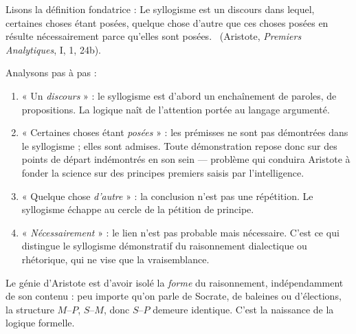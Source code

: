 \documentclass[11pt]{article}
\begin{document}
\begin{experience}
Lisons la définition fondatrice : \guillemotleft Le syllogisme est un discours dans lequel, certaines choses étant posées, quelque chose d'autre que ces choses posées en résulte nécessairement parce qu'elles sont posées. \guillemotright\ (Aristote, \emph{Premiers Analytiques}, I, 1, 24b).

Analysons pas à pas :
\begin{enumerate}
\item « Un \emph{discours} » : le syllogisme est d'abord un enchaînement de paroles, de propositions. La logique naît de l'attention portée au langage argumenté.
\item « Certaines choses étant \emph{posées} » : les prémisses ne sont pas démontrées dans le syllogisme ; elles sont admises. Toute démonstration repose donc sur des points de départ indémontrés en son sein — problème qui conduira Aristote à fonder la science sur des principes premiers saisis par l'intelligence.
\item « Quelque chose \emph{d'autre} » : la conclusion n'est pas une répétition. Le syllogisme échappe au cercle de la pétition de principe.
\item « \emph{Nécessairement} » : le lien n'est pas probable mais nécessaire. C'est ce qui distingue le syllogisme démonstratif du raisonnement dialectique ou rhétorique, qui ne vise que la vraisemblance.
\end{enumerate}
Le génie d'Aristote est d'avoir isolé la \emph{forme} du raisonnement, indépendamment de son contenu : peu importe qu'on parle de Socrate, de baleines ou d'élections, la structure $M$--$P$, $S$--$M$, donc $S$--$P$ demeure identique. C'est la naissance de la logique formelle.
\end{experience}
\end{document}

